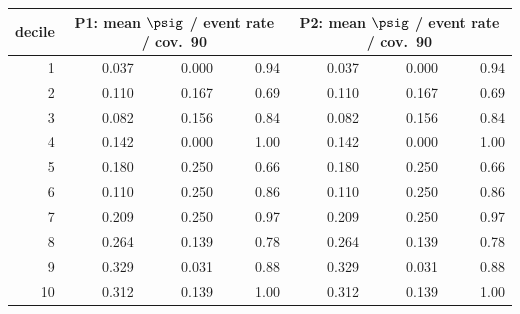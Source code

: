 \begin{tabular}{rrrrrrr}
\toprule
decile & \multicolumn{3}{c}{P1: mean $\psig$ / event rate / cov.\ 90} & \multicolumn{3}{c}{P2: mean $\psig$ / event rate / cov.\ 90} \\
\midrule
1 & 0.037 & 0.000 & 0.94 & 0.037 & 0.000 & 0.94 \\
2 & 0.110 & 0.167 & 0.69 & 0.110 & 0.167 & 0.69 \\
3 & 0.082 & 0.156 & 0.84 & 0.082 & 0.156 & 0.84 \\
4 & 0.142 & 0.000 & 1.00 & 0.142 & 0.000 & 1.00 \\
5 & 0.180 & 0.250 & 0.66 & 0.180 & 0.250 & 0.66 \\
6 & 0.110 & 0.250 & 0.86 & 0.110 & 0.250 & 0.86 \\
7 & 0.209 & 0.250 & 0.97 & 0.209 & 0.250 & 0.97 \\
8 & 0.264 & 0.139 & 0.78 & 0.264 & 0.139 & 0.78 \\
9 & 0.329 & 0.031 & 0.88 & 0.329 & 0.031 & 0.88 \\
10 & 0.312 & 0.139 & 1.00 & 0.312 & 0.139 & 1.00 \\
\bottomrule
\end{tabular}
